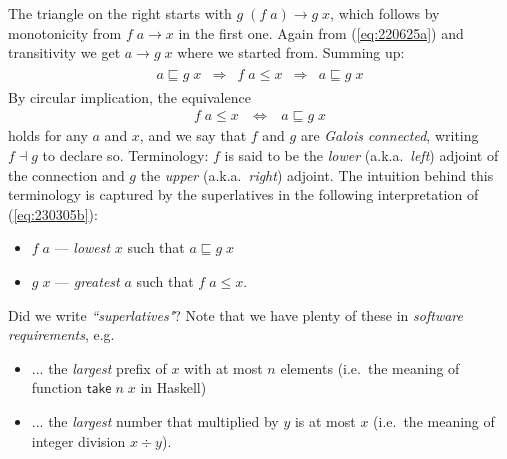 \documentclass{elsarticle}
\newcommand{\Varid}[1]{\mathit{#1}}
\renewcommand{\leq}{\leqslant}
\def\xarrayin#1{\begin{array}{ccccccc}#1\end{array}}
\begin{document}
The triangle on the right starts with \ensuremath{\Varid{g}\;(\Varid{f}\;\Varid{a})\to \Varid{g}\;\Varid{x}}, which follows
by monotonicity from \ensuremath{\Varid{f}\;\Varid{a}\to \Varid{x}} in the first one. Again from (\ref{eq:220625a})
and transitivity we get \ensuremath{\Varid{a}\to \Varid{g}\;\Varid{x}} where we started from. Summing up:
\begin{eqnarray*}
\xarrayin{
	\ensuremath{\Varid{a}\sqsubseteq \Varid{g}\;\Varid{x}} & \ensuremath{\Rightarrow } & \ensuremath{\Varid{f}\;\Varid{a}\leq \Varid{x}} & \ensuremath{\Rightarrow } & \ensuremath{\Varid{a}\sqsubseteq \Varid{g}\;\Varid{x}}
}
\end{eqnarray*}
By circular implication, the equivalence
\begin{eqnarray}
	\ensuremath{\Varid{f}\;\Varid{a}\leq \Varid{x}} & \ensuremath{~\Leftrightarrow~} & \ensuremath{\Varid{a}\sqsubseteq \Varid{g}\;\Varid{x}}
	\label{eq:230305b}
\end{eqnarray}
holds for any \ensuremath{\Varid{a}} and \ensuremath{\Varid{x}}, and we say that \ensuremath{\Varid{f}} and \ensuremath{\Varid{g}} are \emph{Galois connected},
writing \ensuremath{\Varid{f}\mathbin\dashv \Varid{g}} to declare so.
Terminology: \ensuremath{\Varid{f}} is said to be the \emph{lower} (a.k.a.\ \emph{left}) adjoint
of the connection and \ensuremath{\Varid{g}} the \emph{upper} (a.k.a.\ \emph{right}) adjoint. The
intuition behind this terminology is captured by the superlatives in the
following interpretation of (\ref{eq:230305b}):
\begin{itemize}
\item	\ensuremath{\Varid{f}\;\Varid{a}} --- \emph{lowest} \ensuremath{\Varid{x}} such that \ensuremath{\Varid{a}\sqsubseteq \Varid{g}\;\Varid{x}}
\item	\ensuremath{\Varid{g}\;\Varid{x}} --- \emph{greatest} \ensuremath{\Varid{a}} such that \ensuremath{\Varid{f}\;\Varid{a}\leq \Varid{x}}.
\end{itemize}
Did we write \emph{``superlatives"}? Note that we have plenty of these in \emph{software
requirements}, e.g.
\begin{itemize}
\item ... the \emph{largest} prefix of \ensuremath{\Varid{x}} with at most \ensuremath{\Varid{n}} elements (i.e.\ the meaning of function \ensuremath{\mathsf{take}\;\Varid{n}\;\Varid{x}} in Haskell)
\item ... the \emph{largest} number that multiplied by \ensuremath{\Varid{y}} is at most \ensuremath{\Varid{x}} (i.e.\ the meaning of integer division \ensuremath{{\Varid{x}}\div{\Varid{y}}}).
\end{itemize}
\end{document}
